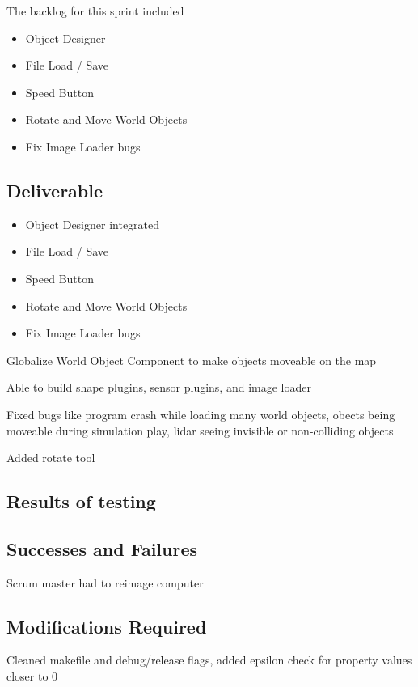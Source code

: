 The backlog for this sprint included

\begin{itemize}
	\item Object Designer
	\item File Load / Save	
	\item Speed Button
	\item Rotate and Move World Objects
	\item Fix Image Loader bugs
\end{itemize}

\subsection{Deliverable}

\begin{itemize}
	\item Object Designer integrated
	\item File Load / Save	
	\item Speed Button
	\item Rotate and Move World Objects
	\item Fix Image Loader bugs
\end{itemize}

Globalize World Object Component to make objects moveable on the map

Able to build shape plugins, sensor plugins, and image loader

Fixed bugs like program crash while loading many world objects, obects being moveable during simulation play, lidar seeing invisible or non-colliding objects

Added rotate tool

\subsection{Results of testing}


\subsection{Successes and Failures}

Scrum master had to reimage computer

\subsection{Modifications Required}
Cleaned makefile and debug/release flags, added epsilon check for property values closer to 0

